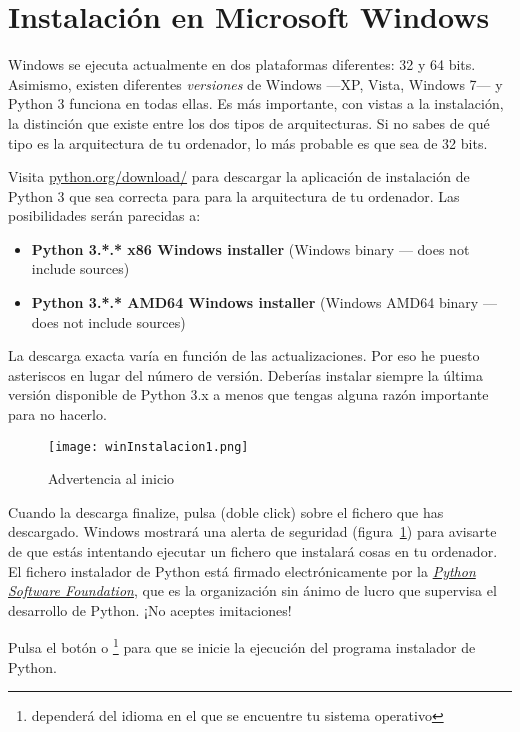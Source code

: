 \section{Instalación en Microsoft Windows}

Windows se ejecuta actualmente en dos plataformas diferentes: 32 y 64 bits. Asimismo, existen diferentes \emph{versiones} de Windows ---XP, Vista, Windows 7--- y Python 3 funciona en todas ellas. Es más importante, con vistas a la instalación, la distinción que existe entre los dos tipos de arquitecturas. Si no sabes de qué tipo es la arquitectura de tu ordenador, lo más probable es que sea de 32 bits.

Visita \href{http://python.org/download/}{python.org/download/} para descargar la aplicación de instalación de Python 3 que sea correcta para para la arquitectura de tu ordenador. Las posibilidades serán parecidas a:

\begin{itemize}
\item \textbf{Python 3.*.* x86 Windows installer} (Windows binary --- does not include sources)
\item \textbf{Python 3.*.* AMD64 Windows installer} (Windows AMD64 binary --- does not include sources)
\end{itemize}

La descarga exacta varía en función de las actualizaciones. Por eso he puesto asteriscos en lugar del número de versión. Deberías instalar siempre la última versión disponible de Python 3.x a menos que tengas alguna razón importante para no hacerlo.

\begin{figure}[!h]
  \begin{center}
\texttt{[image: winInstalacion1.png]}
\caption{Advertencia al inicio}\label{fig01}
  \end{center}
\end{figure}

Cuando la descarga finalize, pulsa (doble click) sobre el fichero  que has descargado. Windows mostrará una alerta de seguridad (figura~\ref{fig01}) para avisarte de que estás intentando ejecutar un fichero que instalará cosas en tu ordenador. El fichero instalador de Python está firmado electrónicamente por la \href{http://www.python.org/psf/}{\emph{Python Software Foundation}}, que es la organización sin ánimo de lucro que supervisa el desarrollo de Python. ¡No aceptes imitaciones!

Pulsa el botón  o \footnote{dependerá del idioma en el que se encuentre tu sistema operativo} para que se inicie la ejecución del programa instalador de Python.

